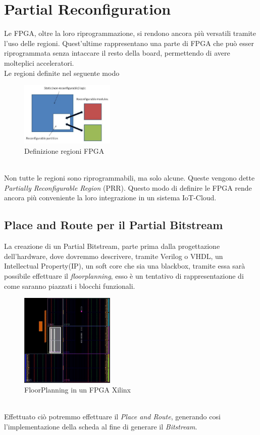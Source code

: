 \section{Partial Reconfiguration}
\label{cap5}
Le FPGA, oltre la loro riprogrammazione, si rendono ancora più versatili tramite l'uso delle regioni. Quest'ultime rappresentano una parte di FPGA che può esser riprogrammata senza intaccare il resto della board, permettendo di avere molteplici acceleratori.\\
Le regioni definite nel seguente modo
\begin{figure}
    \centering
    \includegraphics[width=0.4\textwidth]{images/PR1.png}
    \caption{Definizione regioni FPGA}
    \label{fig:my_label}
\end{figure}\\
Non tutte le regioni sono riprogrammabili, ma solo alcune. Queste vengono dette \textit{Partially Reconfigurable Region} (PRR). Questo modo di definire le FPGA rende ancora più conveniente la loro integrazione in un sistema IoT-Cloud.
\subsection{Place and Route per il Partial Bitstream}
La creazione di un Partial Bitstream, parte prima dalla progettazione dell'hardware, dove dovremmo descrivere, tramite Verilog o VHDL, un Intellectual Property(IP)\cite{PRRGIT}, un soft core che sia una blackbox, tramite essa sarà possibile effettuare il \textit{floorplanning}, esso è un tentativo di rappresentazione di come saranno piazzati i blocchi funzionali.
\begin{figure}
    \centering
    \includegraphics[width=0.4\textwidth]{images/Floor1.jpg}
    \caption{FloorPlanning in un FPGA Xilinx}
    \label{fig:my_label}
\end{figure}\\
Effettuato ciò potremmo effettuare il \textit{Place and Route}, generando cosi l'implementazione della scheda al fine di generare il \textit{Bitstream}\cite{PRR}. 
